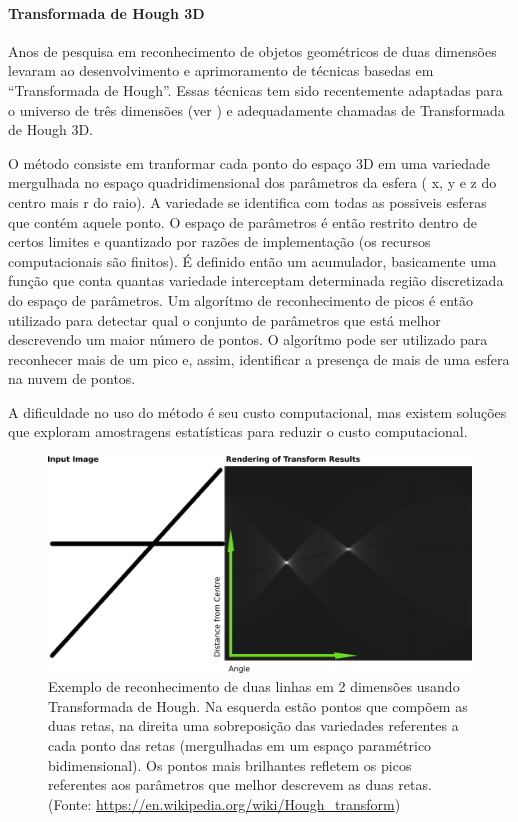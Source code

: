  \paragraph{Transformada de Hough 3D}
Anos de pesquisa em reconhecimento de objetos geométricos de duas dimensões
levaram ao desenvolvimento e aprimoramento de técnicas basedas em ``Transformada
de Hough''. Essas técnicas tem sido recentemente adaptadas para o universo de
três dimensões (ver \cite{hough2014}) e adequadamente chamadas de Transformada
de Hough 3D.

O método consiste em tranformar cada ponto do espaço 3D em uma variedade
mergulhada no espaço quadridimensional dos parâmetros da esfera ( x, y e z do
centro mais r do raio). A variedade se identifica com todas as possiveis esferas
que contém aquele ponto. O espaço de parâmetros é então restrito dentro de
certos limites e quantizado por razões de implementação (os recursos computacionais são finitos). É definido então um acumulador, basicamente uma função que conta
quantas variedade interceptam determinada região discretizada do espaço de
parâmetros. Um algorítmo de reconhecimento de picos é então utilizado para
detectar qual o conjunto de parâmetros que está melhor descrevendo um maior
número de pontos. O algorítmo pode ser utilizado para reconhecer mais de um
pico e, assim, identificar a presença de mais de uma esfera na nuvem de pontos.

A dificuldade no uso do método é seu custo computacional, mas existem soluções
que exploram amostragens estatísticas para reduzir o custo computacional.

\begin{figure}[h!]
   \centering
   \includegraphics[width=0.95\columnwidth]{figs/localizacao/hough}
   \caption{Exemplo de reconhecimento de duas linhas em 2 dimensões usando
   Transformada de Hough. Na esquerda estão pontos que compõem as duas retas, na
   direita uma sobreposição das variedades referentes a cada ponto das retas
   (mergulhadas em um espaço paramétrico bidimensional). Os pontos mais
   brilhantes refletem os picos referentes aos parâmetros que melhor descrevem as duas retas. (Fonte: 
   \url{https://en.wikipedia.org/wiki/Hough_transform})}
   \label{fig::ransac}
\end{figure}

